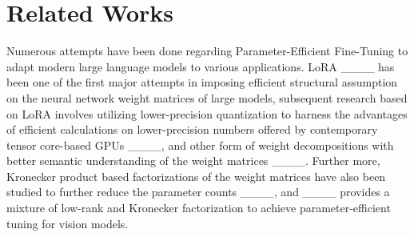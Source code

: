\section{Related Works}
Numerous attempts have been done regarding Parameter-Efficient Fine-Tuning to adapt modern large language models to various applications. LoRA ____ has been one of the first major attempts in imposing efficient structural assumption on the neural network weight matrices of large models, subsequent research based on LoRA involves utilizing lower-precision quantization to harness the advantages of efficient calculations on lower-precision numbers offered by contemporary tensor core-based GPUs ____, and other form of weight decompositions with better semantic understanding of the weight matrices ____. Further more, Kronecker product based factorizations of the weight matrices have also been studied to further reduce the parameter counts ____, and ____ provides a mixture of low-rank and Kronecker factorization to achieve parameter-efficient tuning for vision models.